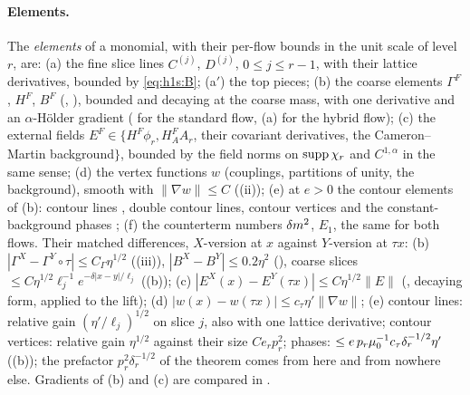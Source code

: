 \paragraph{Elements.}
The \emph{elements} of a monomial, with their per-flow bounds in the unit scale of level $r$, are: (a) the fine slice lines $C^{(j)}$, $D^{(j)}$, $0\le j\le r-1$, with their lattice derivatives, bounded by \eqref{eq:h1s:B}; (a$'$) the top pieces; (b) the coarse elements $\Gamma^F$, $H^F$, $B^F$ (, ), bounded and decaying at the coarse mass, with one derivative and an $\alpha$-H\"older gradient (\cite[Thm.~3.3]{K1} for the standard flow, (a) for the hybrid flow); (c) the external fields $E^F\in\{H^F\phi_r,H^F_AA_r$, their covariant derivatives, the Cameron--Martin background$\}$, bounded by the field norms \cite[(3.2)]{K1} on $\operatorname{supp}\chi_r$ and $C^{1,\alpha}$ in the same sense; (d) the vertex functions $w$ (couplings, partitions of unity, the background), smooth with $\|\nabla w\|\le C$ ((ii)); (e) at $e>0$ the contour elements of (b): contour lines \cite[(3.27)]{K1}, double contour lines, contour vertices \cite[(3.24)--(3.26)]{K1} and the constant-background phases \cite[(3.46)]{K1}; (f) the counterterm numbers $\delta m^2$, $E_1$, the same for both flows. Their matched differences, $X$-version at $x$ against $Y$-version at $\tau x$: (b) $|\Gamma^X-\Gamma^Y\circ\tau|\le C_\Gamma\eta^{1/2}$ ((iii)), $|B^X-B^Y|\le0.2\eta^2$ (), coarse slices $\le C\eta^{1/2}\ell_j^{-1}e^{-\delta|x-y|/\ell_j}$ ((b)); (c) $|E^X(x)-E^Y(\tau x)|\le C\eta^{1/2}\|E\|$ (, decaying form, applied to the lift); (d) $|w(x)-w(\tau x)|\le c_\tau\eta'\|\nabla w\|$; (e) contour lines: relative gain $(\eta'/\ell_j)^{1/2}$ on slice $j$, also with one lattice derivative; contour vertices: relative gain $\eta^{1/2}$ against their size $Ce_rp_r^2$; phases: $\le e\,p_r\mu_0^{-1}c_\tau\delta_r^{-1/2}\eta'$ ((b)); the prefactor $p_r^2\delta_r^{-1/2}$ of the theorem comes from here and from nowhere else. Gradients of (b) and (c) are compared in .

